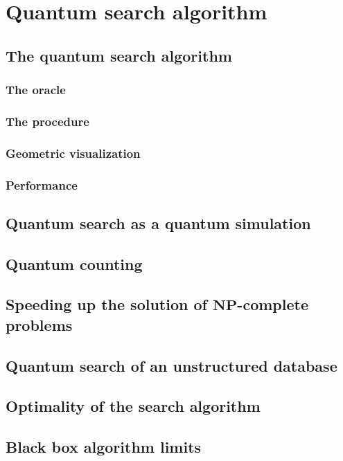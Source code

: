 \documentclass{book}
\theoremstyle{definition}
\begin{document}
\newpage



\section{Quantum search algorithm}

\subsection{The quantum search algorithm}
\subsubsection{The oracle}
\subsubsection{The procedure}
\subsubsection{Geometric visualization}
\subsubsection{Performance}
\subsection{Quantum search as a quantum simulation}
\subsection{Quantum counting}
\subsection{Speeding up the solution of $\mathbf{NP}$-complete problems}
\subsection{Quantum search of an unstructured database}
\subsection{Optimality of the search algorithm}
\subsection{Black box algorithm limits}
\end{document}

